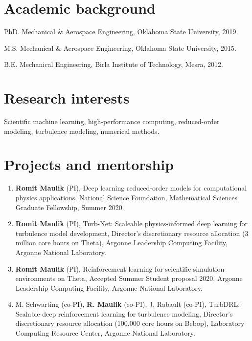 \documentclass[letterpaper]{article}
\renewenvironment{itemize}{
  \begin{list}{}{
    \setlength{\leftmargin}{1.5em}
  }
}{
  \end{list}
}
\begin{document}
\section*{Academic background}

\begin{itemize}
  \item PhD. Mechanical \& Aerospace Engineering, Oklahoma State University, 2019.
  \item M.S. Mechanical \& Aerospace Engineering, Oklahoma State University, 2015.
  \item B.E. Mechanical Engineering, Birla Institute of Technology, Mesra, 2012. 
\end{itemize}

\section*{Research interests}

Scientific machine learning, high-performance computing, reduced-order modeling, turbulence modeling, numerical methods. 

\section*{Projects and mentorship}

\begin{enumerate}
	\item \textbf{Romit Maulik} (PI), Deep learning reduced-order models for computational physics applications, National Science Foundation, Mathematical Sciences Graduate Fellowship, Summer 2020.

    \item \textbf{Romit Maulik} (PI), Turb-Net: Scaleable physics-informed deep learning for turbulence model development, Director's discretionary resource allocation (3 million core hours on Theta), Argonne Leadership Computing Facility, Argonne National Laboratory.

    \item \textbf{Romit Maulik} (PI), Reinforcement learning for scientific simulation environments on Theta, Accepted Summer Student proposal 2020, Argonne Leadership Computing Facility, Argonne National Laboratory.

    \item M. Schwarting (co-PI), \textbf{R. Maulik} (co-PI), J. Rabault (co-PI), TurbDRL: Scalable deep reinforcement learning for turbulence modeling, Director's discretionary resource allocation (100,000 core hours on Bebop), Laboratory Computing Resource Center, Argonne National Laboratory.
\end{enumerate}
\end{document}
